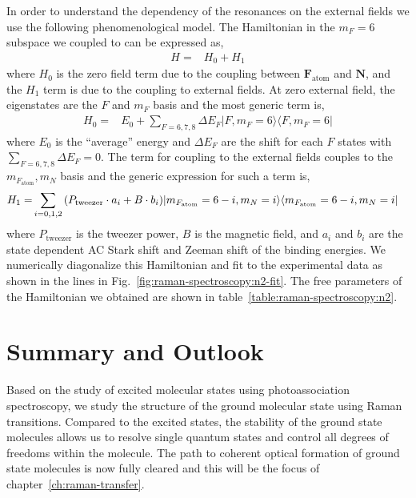 In order to understand the dependency of the resonances on the external fields
we use the following phenomenological model.
The Hamiltonian in the $m_F=6$ subspace we coupled to can be expressed as,
\begin{align*}
  H=&H_0+H_1
\end{align*}
where $H_0$ is the zero field term due to the coupling
between $\mathbf{F}_{\mathrm{atom}}$ and $\mathbf{N}$,
and the $H_1$ term is due to the coupling to external fields.
At zero external field, the eigenstates are the $F$ and $m_F$ basis
and the most generic term is,
\begin{align*}
  H_0=&E_0+\!\!\sum_{F=6,7,8}\Delta E_F|F,m_F=6\rangle\langle F,m_F=6|
\end{align*}
where $E_0$ is the ``average'' energy and $\Delta E_F$ are the shift for each $F$ states
with $\sum_{F=6,7,8}\Delta E_F = 0$.
The term for coupling to the external fields couples to the $m_{F_\mathrm{atom}},m_N$ basis
and the generic expression for such a term is,
\begin{align*}
  H_1=&\sum_{i=0,1,2}{\left({P_{\mathrm{tweezer}}\cdot a_i+B\cdot b_i}\right)}|m_{F_\mathrm{atom}}=6-i,m_N=i\rangle\langle m_{F_\mathrm{atom}}=6-i,m_N=i|
\end{align*}
where $P_{\mathrm{tweezer}}$ is the tweezer power, $B$ is the magnetic field,
and $a_i$ and $b_i$ are the state dependent AC Stark shift and Zeeman shift
of the binding energies.
We numerically diagonalize this Hamiltonian and fit to the experimental data
as shown in the lines in Fig.~\ref{fig:raman-spectroscopy:n2-fit}.
The free parameters of the Hamiltonian we obtained are shown in
table~\ref{table:raman-spectroscopy:n2}.

\section{Summary and Outlook}
\label{ch:raman-spectroscopy:summary}
Based on the study of excited molecular states using photoassociation spectroscopy,
we study the structure of the ground molecular state using Raman transitions.
Compared to the excited states, the stability of the ground state molecules
allows us to resolve single quantum states and
control all degrees of freedoms within the molecule.
The path to coherent optical formation of ground state molecules
is now fully cleared and this will be the focus of chapter~\ref{ch:raman-transfer}.
